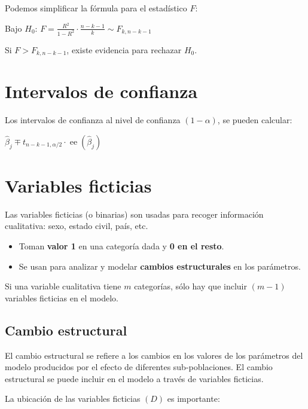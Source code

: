 \documentclass[10pt, a4paper, landscape]{article}
\DeclareMathOperator{\se}{ee}
\begin{document}
\begin{multicols}{3}
Podemos simplificar la fórmula para el estadístico \( F \):

\begin{center}
	Bajo \( H_{0} \): \quad \( F = \frac{R^{2}}{1 - R^{2}} \cdot \frac{n - k - 1}{k} \sim F_{k, n - k - 1} \)
\end{center}

Si \( F > F_{k, n - k - 1} \), existe evidencia para rechazar \( H_{0} \).

\section*{Intervalos de confianza}

Los intervalos de confianza al nivel de confianza \( (1 - \alpha) \), se pueden calcular:

\begin{center}
	\( \hat{\beta}_{j} \mp t_{n - k - 1, \alpha / 2} \cdot \se(\hat{\beta}_{j}) \)
\end{center}

\columnbreak

\section*{Variables ficticias}

Las variables ficticias (o binarias) son usadas para recoger información cualitativa: sexo, estado civil, país, etc.

\begin{itemize}[leftmargin=*]
	\item Toman \textbf{valor 1} en una categoría dada y \textbf{0 en el resto}.
	\item Se usan para analizar y modelar \textbf{cambios estructurales} en los parámetros.
\end{itemize}

Si una variable cualitativa tiene \( m \) categorías, sólo hay que incluir \( (m - 1) \) variables ficticias en el modelo.

\subsection*{Cambio estructural}

El cambio estructural se refiere a los cambios en los valores de los parámetros del modelo producidos por el efecto de diferentes sub-poblaciones. El cambio estructural se puede incluir en el modelo a través de variables ficticias.

La ubicación de las variables ficticias \( (D) \) es importante:


\end{multicols}
\end{document}
